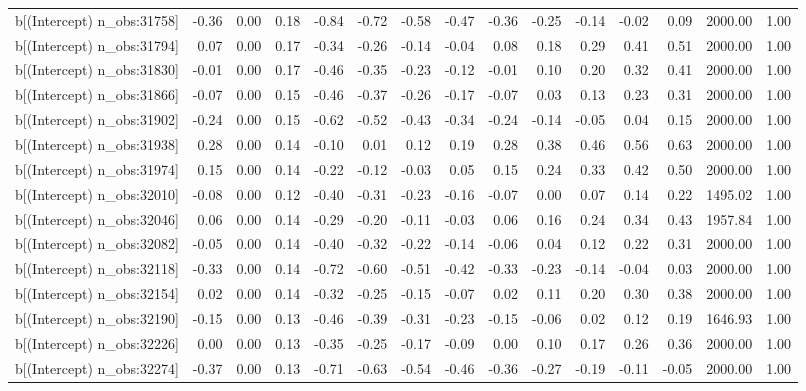 \begin{table}[ht]
\begin{tabular}{rrrrrrrrrrrrrrr}
  b[(Intercept) n\_obs:31758] & -0.36 & 0.00 & 0.18 & -0.84 & -0.72 & -0.58 & -0.47 & -0.36 & -0.25 & -0.14 & -0.02 & 0.09 & 2000.00 & 1.00 \\ 
  b[(Intercept) n\_obs:31794] & 0.07 & 0.00 & 0.17 & -0.34 & -0.26 & -0.14 & -0.04 & 0.08 & 0.18 & 0.29 & 0.41 & 0.51 & 2000.00 & 1.00 \\ 
  b[(Intercept) n\_obs:31830] & -0.01 & 0.00 & 0.17 & -0.46 & -0.35 & -0.23 & -0.12 & -0.01 & 0.10 & 0.20 & 0.32 & 0.41 & 2000.00 & 1.00 \\ 
  b[(Intercept) n\_obs:31866] & -0.07 & 0.00 & 0.15 & -0.46 & -0.37 & -0.26 & -0.17 & -0.07 & 0.03 & 0.13 & 0.23 & 0.31 & 2000.00 & 1.00 \\ 
  b[(Intercept) n\_obs:31902] & -0.24 & 0.00 & 0.15 & -0.62 & -0.52 & -0.43 & -0.34 & -0.24 & -0.14 & -0.05 & 0.04 & 0.15 & 2000.00 & 1.00 \\ 
  b[(Intercept) n\_obs:31938] & 0.28 & 0.00 & 0.14 & -0.10 & 0.01 & 0.12 & 0.19 & 0.28 & 0.38 & 0.46 & 0.56 & 0.63 & 2000.00 & 1.00 \\ 
  b[(Intercept) n\_obs:31974] & 0.15 & 0.00 & 0.14 & -0.22 & -0.12 & -0.03 & 0.05 & 0.15 & 0.24 & 0.33 & 0.42 & 0.50 & 2000.00 & 1.00 \\ 
  b[(Intercept) n\_obs:32010] & -0.08 & 0.00 & 0.12 & -0.40 & -0.31 & -0.23 & -0.16 & -0.07 & 0.00 & 0.07 & 0.14 & 0.22 & 1495.02 & 1.00 \\ 
  b[(Intercept) n\_obs:32046] & 0.06 & 0.00 & 0.14 & -0.29 & -0.20 & -0.11 & -0.03 & 0.06 & 0.16 & 0.24 & 0.34 & 0.43 & 1957.84 & 1.00 \\ 
  b[(Intercept) n\_obs:32082] & -0.05 & 0.00 & 0.14 & -0.40 & -0.32 & -0.22 & -0.14 & -0.06 & 0.04 & 0.12 & 0.22 & 0.31 & 2000.00 & 1.00 \\ 
  b[(Intercept) n\_obs:32118] & -0.33 & 0.00 & 0.14 & -0.72 & -0.60 & -0.51 & -0.42 & -0.33 & -0.23 & -0.14 & -0.04 & 0.03 & 2000.00 & 1.00 \\ 
  b[(Intercept) n\_obs:32154] & 0.02 & 0.00 & 0.14 & -0.32 & -0.25 & -0.15 & -0.07 & 0.02 & 0.11 & 0.20 & 0.30 & 0.38 & 2000.00 & 1.00 \\ 
  b[(Intercept) n\_obs:32190] & -0.15 & 0.00 & 0.13 & -0.46 & -0.39 & -0.31 & -0.23 & -0.15 & -0.06 & 0.02 & 0.12 & 0.19 & 1646.93 & 1.00 \\ 
  b[(Intercept) n\_obs:32226] & 0.00 & 0.00 & 0.13 & -0.35 & -0.25 & -0.17 & -0.09 & 0.00 & 0.10 & 0.17 & 0.26 & 0.36 & 2000.00 & 1.00 \\ 
  b[(Intercept) n\_obs:32274] & -0.37 & 0.00 & 0.13 & -0.71 & -0.63 & -0.54 & -0.46 & -0.36 & -0.27 & -0.19 & -0.11 & -0.05 & 2000.00 & 1.00 \\ 

\end{tabular}
\end{table}
